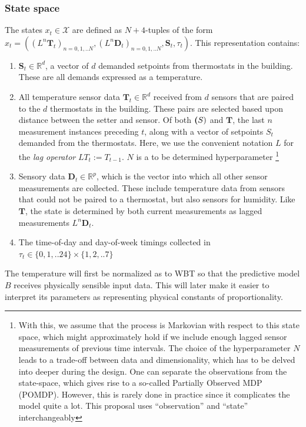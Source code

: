 \documentclass{article}
\theoremstyle{definition}
\theoremstyle{remark}
\begin{document}
\subsubsection{State space}
The states $x_t\in \mathcal{X}$ are defined as $N+4$-tuples of the form ${x_t = ((L^n\textbf{T}_t)_{n=0,1,..N}, (L^n\textbf{D}_t)_{n=0,1,..N}, \textbf{S}_t, \tau_t)}$. This representation contains:
\begin{enumerate}
    \item $\textbf{S}_t \in \mathbb{R}^d$, a vector of $d$ demanded setpoints from thermostats in the building. These are all demands expressed as a temperature.
    \item All temperature sensor data $\textbf{T}_t \in \mathbb{R}^d$ received from $d$ sensors that are paired to the $d$ thermostats in the building. These pairs are selected based upon distance between the setter and sensor. Of both $\textbf(S)$ and $\textbf{T}$, the last $n$ measurement instances preceding $t$, along with a vector of setpoints $\textit{S}_t$ demanded from the thermostats. Here, we use the convenient notation $L$ for the \textit{lag operator} $LT_t := T_{t-1}$. $N$ is a to be determined hyperparameter \footnote{With this, we assume that the process is Markovian with respect to this state space, which might approximately hold if we include enough lagged sensor measurements of previous time intervals. The choice of the hyperparameter $N$ leads to a trade-off between data and dimensionality, which has to be delved into deeper during the design. One can separate the observations from the state-space, which gives rise to a so-called Partially Observed MDP (POMDP). However, this is rarely done in practice since it complicates the model quite a lot. This proposal uses ``observation'' and ``state'' interchangeably}
    \item Sensory data $\textbf{D}_t \in \mathbb{R}^p$, which is the vector into which all other sensor measurements are collected. These include temperature data from sensors that could not be paired to a thermostat, but also sensors for humidity. Like $\mathbf{T}$, the state is determined by both current measurements as lagged measurements $L^n\mathbf{D}_t$.
    \item The time-of-day and day-of-week timings collected in $\tau_t\in \{0,1,..24\}\times \{1,2,..7\}$
\end{enumerate}
The temperature will first be normalized as to WBT so that the predictive model $B$ receives physically sensible input data. This will later make it easier to interpret its parameters as representing physical constants of proportionality.
\end{document}
